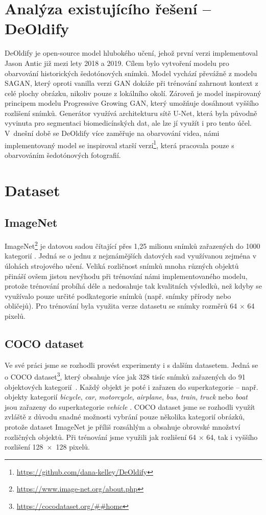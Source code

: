 \documentclass[12pt, a4paper]{article}
\begin{document}
    \section{Analýza existujícího řešení -- DeOldify}
    DeOldify \cite{deoldify} je open-source model hlubokého učení, jehož první verzi implementoval Jason Antic již mezi lety 2018 a 2019. Cílem bylo vytvoření modelu pro obarvování historických šedotónových snímků. Model vychází převážně z modelu SAGAN, který oproti vanilla verzi GAN dokáže při trénování zahrnout kontext z celé plochy obrázku, nikoliv pouze z lokálního okolí. Zároveň je model inspirovaný principem modelu Progressive Growing GAN, který umožňuje dosáhnout vyššího rozlišení snímků. Generátor využívá architekturu sítě U-Net, která byla původně vyvinuta pro segmentaci biomedicínských dat, ale lze jí  využít i pro tento účel. V~dnešní době se DeOldify více zaměřuje na obarvování videa, námi implementovaný model se inspiroval starší verzí\footnote{\url{https://github.com/dana-kelley/DeOldify}}, která pracovala pouze s obarvováním šedotónových fotografií.
    
    \section{Dataset}
    
    \subsection{ImageNet}\label{section:ImageNet}
    ImageNet\footnote{\url{https://www.image-net.org/about.php}} je datovou sadou čítající přes 1,25 milionu snímků zařazených do 1000 kategorií \cite{ImageNetStats}. Jedná se o jednu z nejznámějších datových sad využívanou zejména v úlohách strojového učení. Veliká rozličnost snímků mnoha různých objektů přináší ovšem jistou nevýhodu při trénování námi implementovaného modelu, protože trénování probíhá déle a nedosahuje tak kvalitních výsledků, než kdyby se využívalo pouze určité podkategorie snímků (např. snímky přírody nebo obličejů). Pro trénování byla využita verze datasetu se snímky rozměrů 64 $\times$ 64 pixelů.
    
    \subsection{COCO dataset}
    Ve své práci jsme se rozhodli provést experimenty i s dalším datasetem. Jedná se o COCO dataset\footnote{\url{https://cocodataset.org/##home}}, který obsahuje více jak 328 tisíc snímků zařazených do 91 objektových kategorií~\cite{lin2015microsoft}. Každý objekt je poté i zařazen do superkategorie -- např. objekty kategorií \textit{bicycle}, \textit{car}, \textit{motorcycle}, \textit{airplane}, \textit{bus}, \textit{train}, \textit{truck} nebo \textit{boat} jsou zařazeny do superkategorie \textit{vehicle} \cite{CocoCategories}. COCO dataset jsme se rozhodli využít zvláště z důvodu snadné možnosti vybrání pouze několika kategorií obrázků, protože dataset ImageNet je příliš rozsáhlým a obsahuje obrovské množství rozličných objektů. Při trénování jsme využili jak rozlišení 64 $\times$ 64, tak i vyššího rozlišení 128~$\times$~128 pixelů.
    
\end{document}
